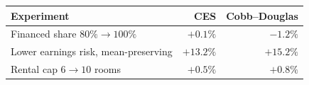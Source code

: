 \begin{tabular}{@{}lrr@{}}
\toprule
Experiment & CES & Cobb--Douglas \\
\midrule
Financed share $80\%\to100\%$ & $+0.1\%$ & $-1.2\%$ \\
Lower earnings risk, mean-preserving & $+13.2\%$ & $+15.2\%$ \\
Rental cap $6\to10$ rooms & $+0.5\%$ & $+0.8\%$ \\
\bottomrule
\end{tabular}
